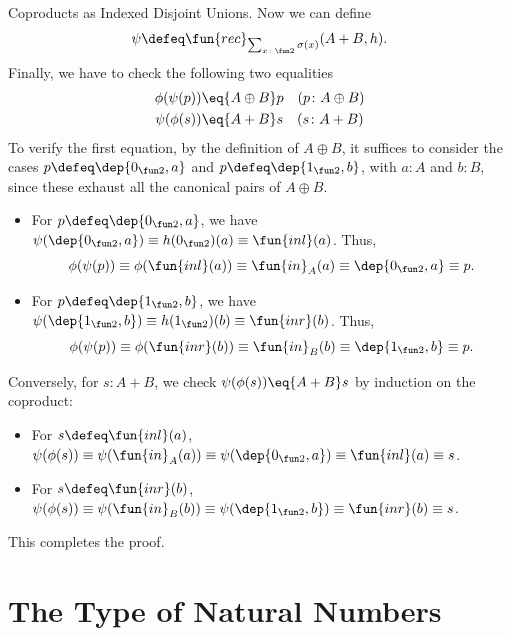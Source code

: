 \begin{lpar}{Coproducts as Indexed Disjoint Unions.}
    Now we can define
    \begin{equation}\label{eq:psi-sigma-to-coproduct}
        \psi\defeq\fun{rec}_{\sum_{x\colon\fun2}\sigma(x)}(A+B,h).
    \end{equation}
    Finally, we have to check the following two equalities
    \begin{align*}
        \phi(\psi(p))&\eq{A\oplus B}p\quad(p\colon A\oplus B)\\
        \psi(\phi(s))&\eq{A+B}s\quad(s\colon A+B)
    \end{align*}
    To verify the first equation, by the definition of $A\oplus B$, it suffices to consider the cases $p\defeq\dep{0_{\fun2},a}$ and $p\defeq\dep{1_{\fun2},b}$, with $a\colon A$ and $b\colon B$, since these exhaust all the canonical pairs of $A\oplus B$.
    \begin{itemize}
        \item For $p\defeq\dep{0_{\fun2},a}$, we have $\psi(\dep{0_{\fun2},a}) \equiv h(0_{\fun2})(a) \equiv \fun{inl}(a)$. Thus,
        \[
            \phi(\psi(p))
                \equiv\phi(\fun{inl}(a))
                \equiv\fun{in}_A(a)
                \equiv\dep{0_{\fun2},a}
                \equiv p.
        \]
        \item For $p\defeq\dep{1_{\fun2},b}$, we have $\psi(\dep{1_{\fun2},b})\equiv h(1_{\fun2})(b)\equiv\fun{inr}(b)$. Thus,
        \[
            \phi(\psi(p))
                \equiv\phi(\fun{inr}(b))
                \equiv\fun{in}_B(b)
                \equiv\dep{1_{\fun2},b}
                \equiv p.
        \]
    \end{itemize}
    Conversely, for $s\colon A+B$, we check $\psi(\phi(s))\eq{A+B}s$ by induction on the coproduct:
    \begin{itemize}
        \item For $s\defeq\fun{inl}(a)$, $\psi(\phi(s)) \equiv\psi(\fun{in}_A(a))\equiv\psi(\dep{0_{\fun2},a})\equiv\fun{inl}(a)\equiv s$.
        \item For $s\defeq\fun{inr}(b)$, $\psi(\phi(s)) \equiv\psi(\fun{in}_B(b))\equiv\psi(\dep{1_{\fun2},b})\equiv\fun{inr}(b)\equiv s$.
    \end{itemize}
    This completes the proof.
\end{lpar}

\section{The Type of Natural Numbers}

